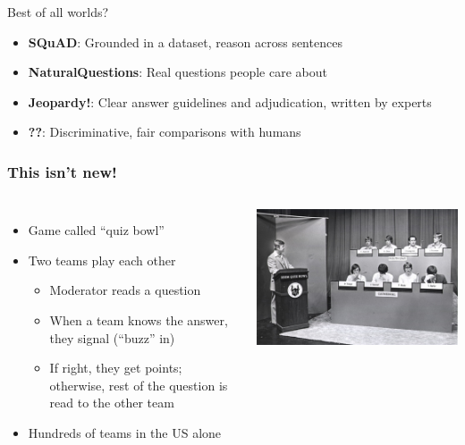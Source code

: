 \documentclass[xcolor=dvipsnames,xcolor=table]{beamer}
\newcommand{\fsi}[2]{
\begin{frame}[plain]
\vspace*{-1pt}
\makebox[\linewidth]{\texttt{[image: \#1]}}
\begin{center}
#2
\end{center}
\end{frame}
}
\begin{document}
\fsi{qb/jeopardy_adjudication_0}{}
\fsi{qb/jeopardy_adjudication_1}{}
\fsi{qb/jeopardy_adjudication_2}{}
\fsi{qb/jeopardy_adjudication_3}{}
\fsi{qb/jeopardy_adjudication_4}{}

\begin{frame}{Best of all worlds?}

  \begin{itemize}
    \item {\bf SQuAD}:  Grounded in a dataset, reason across sentences
    \item {\bf NaturalQuestions}: Real questions people care about
    \item {\bf Jeopardy!}: Clear answer guidelines and adjudication, written by experts
    \item {\bf ??}: Discriminative, fair comparisons with humans
  \end{itemize}

\end{frame}

\begin{frame}
	\frametitle{This isn't new!}
	\begin{columns}

	\begin{itemize}
		\item Game called ``quiz bowl''
		\item Two teams play each other
		\begin{itemize}
			\item Moderator reads a question
			\item When a team knows the answer, they signal (``buzz'' in)
			\item If right, they get points; otherwise, rest of the question is read to the other team
		\end{itemize}
		\item Hundreds of teams in the US alone
	\end{itemize}

	\includegraphics{qb/quizbowl}

	\end{columns}

\end{frame}
\end{document}
